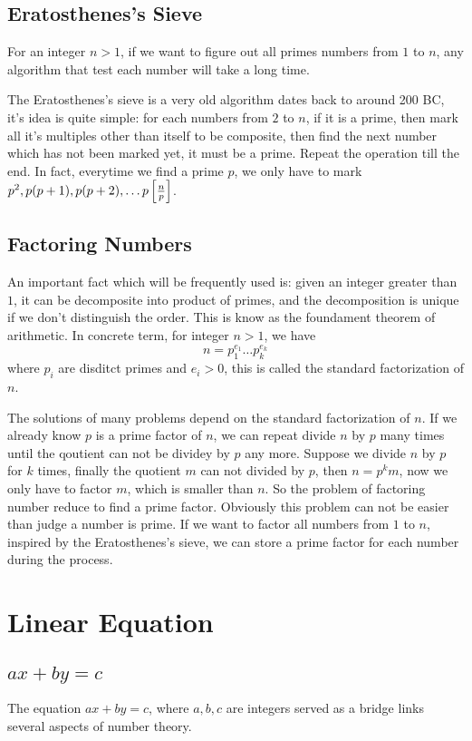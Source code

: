 \subsection{Eratosthenes's Sieve}
For an integer $n > 1$, if we want to figure out all primes numbers from $1$ to $n$,
any algorithm that test each number will take a long time.

The Eratosthenes's sieve is a very old algorithm dates back to around 200 BC,
it's idea is quite simple: for each numbers from $2$ to $n$, if it is a prime,
then mark all it's multiples other than itself to be composite,
then find the next number which has not been marked yet, it must be a prime.
Repeat the operation till the end. In fact, everytime we find a prime $p$,
we only have to mark $p^2, p(p + 1), p(p + 2), \dots p\left[{n \over p}\right]$.



\subsection{Factoring Numbers}
An important fact which will be frequently used is:
given an integer greater than $1$, it can be decomposite into product of primes,
and the decomposition is unique if we don't distinguish the order.
This is know as the foundament theorem of arithmetic.
In concrete term, for integer $n > 1$, we have
$$n = p_1^{e_1} \dots p_k^{e_k}$$
where $p_i$ are disditct primes and $e_i > 0$, this is called the standard factorization of $n$.

The solutions of many problems depend on the standard factorization of $n$.
If we already know $p$ is a prime factor of $n$,
we can repeat divide $n$ by $p$ many times until the qoutient can not be dividey by $p$ any more.
Suppose we divide $n$ by $p$ for $k$ times, finally the quotient $m$ can not divided by $p$,
then $n = p^k m$, now we only have to factor $m$, which is smaller than $n$.
So the problem of factoring number reduce to find a prime factor.
Obviously this problem can not be easier than judge a number is prime.
If we want to factor all numbers from $1$ to $n$, inspired by the Eratosthenes's sieve,
we can store a prime factor for each number during the process.


\section{Linear Equation}
\subsection{$ax + by = c$}
The equation $ax + by = c$, where $a, b, c$ are integers served as a bridge links several aspects of number theory.

